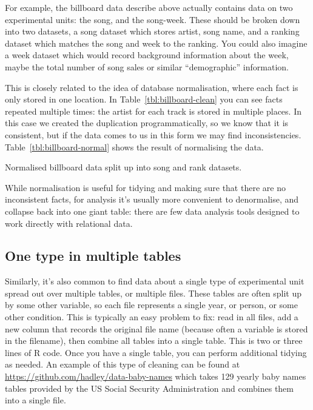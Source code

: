 \documentclass[oneside]{article}
\begin{document}
For example, the billboard data describe above actually contains data on two experimental units: the song, and the song-week. These should be broken down into two datasets, a song dataset which stores artist, song name, and a ranking dataset which matches the song and week to the ranking. You could also imagine a week dataset which would record background information about the week, maybe the total number of song sales or similar ``demographic'' information.


This is closely related to the idea of database normalisation, where each fact is only stored in one location. In Table~\ref{tbl:billboard-clean} you can see facts repeated multiple times: the artist for each track is stored in multiple places. In this case we created the duplication programmatically, so we know that it is consistent, but if the data comes to us in this form we may find inconsistencies. Table~\ref{tbl:billboard-normal} shows the result of normalising the data.

\begin{table}
  \centering
  
  

  \caption{Normalised billboard data split up into song and rank datasets.}
  \label{tbl:billboard-normal}
\end{table}

While normalisation is useful for tidying and making sure that there are no inconsistent facts, for analysis it's usually more convenient to denormalise, and collapse back into one giant table: there are few data analysis tools designed to work directly with relational data.

\subsection{One type in multiple tables}

Similarly, it's also common to find data about a single type of experimental unit spread out over multiple tables, or multiple files. These tables are often split up by some other variable, so each file represents a single year, or person, or some other condition. This is typically an easy problem to fix: read in all files, add a new column that records the original file name (because often a variable is stored in the filename), then combine all tables into a single table. This is two or three lines of R code. Once you have a single table, you can perform additional tidying as needed. An example of this type of cleaning can be found at \url{https://github.com/hadley/data-baby-names} which takes 129 yearly baby names tables provided by the US Social Security Administration and combines them into a single file.
\end{document}
